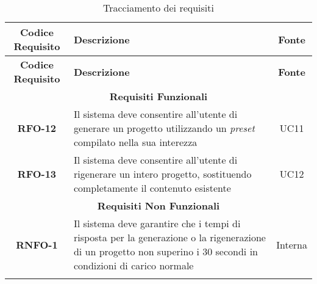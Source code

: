 \renewcommand{\arraystretch}{1.5} %

\begin{longtable}{|c|>{\centering\arraybackslash}p{}|c|} %
    \hline
    \rowcolor{green!30} %
    \textbf{Codice Requisito} & \textbf{Descrizione} & \textbf{Fonte} \\
    \hline
    \endfirsthead %
    
    \hline
    \rowcolor{green!30} %
    \textbf{Codice Requisito} & \textbf{Descrizione} & \textbf{Fonte} \\
    \hline
    \endhead %
    
    \hline
    \multicolumn{3}{|c|}{\rowcolor{green!30} \textbf{Requisiti Funzionali}} \\
    \hline
    \textbf{RFO-12} & Il sistema deve consentire all'utente di generare un progetto utilizzando un \textit{preset} compilato nella sua interezza & UC11 \\
    \hline
    \textbf{RFO-13} & Il sistema deve consentire all'utente di rigenerare un intero progetto, sostituendo completamente il contenuto esistente & UC12 \\
    \hline
    \multicolumn{3}{|c|}{\rowcolor{green!30} \textbf{Requisiti Non Funzionali}} \\
    \hline %
    \textbf{RNFO-1} & Il sistema deve garantire che i tempi di risposta per la generazione o la rigenerazione di un progetto non superino i 30 secondi in condizioni di carico normale & Interna \\
    \hline
    \caption{Tracciamento dei requisiti} %
    \label{tab:requisiti-stage} %
\end{longtable}